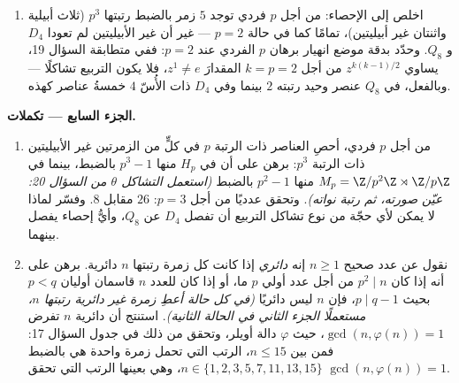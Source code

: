 \begin{problem}
\begin{enumerate}[resume]
        \cref{exo:b3:groups:10}). برهن على أنه يوجد $s \notin N$ يحقق
        $s^p = e$ \emph{(خذ أي $t \notin N$؛ وباستعمال السؤال
        20، صحّحه: $\theta(t) = t^p \in Z(G) \subseteq N$ --- برّر $Z(G) = \langle r^p\rangle$ --- ثم اختر $a$
        بحيث يحقق $s = tr^{a}$ الشرط $s^p = e$؛ وأين استُعملت
        فردية $p$؟)}. وبرهن على أن $srs^{-1} = r^{1+p}$، إلى حدود استبدال $s$
        بقوة له، ثم اخلص إلى أنه توجد زمرة غير أبيلية
        \emph{واحدة} بالضبط رتبتها $p^3$ وأُسّها $p^2$، وهي
        $\Z/p^2\Z \rtimes_\varphi \Z/p\Z$ حيث $\varphi(1)\colon r \mapsto r^{1+p}$ \emph{(استعمل السؤال 3؛ والزمرة
        $\operatorname{Aut}(\Z/p^2\Z)$ دائرية رتبتها $p(p-1)$، وهي نتيجة نقبلها هنا،
        ومنه لها زمرة جزئية وحيدة رتبتها $p$)}.
  \item اخلص إلى الإحصاء: من أجل $p$ فردي توجد $5$ زمر بالضبط
        رتبتها $p^3$ (ثلاث أبيلية واثنتان غير أبيليتين)، تمامًا
        كما في حالة $p = 2$ --- غير أن غير الأبيليتين لم تعودا
        $D_4$ و $Q_8$. وحدّد بدقة موضع انهيار برهان $p$ الفردي
        عند $p = 2$: ففي متطابقة السؤال 19، يساوي $z^{k(k-1)/2}$
        من أجل $k = p = 2$ المقدارَ $z^1 \neq
        e$، فلا يكون التربيع
        تشاكلًا --- وبالفعل، في $Q_8$ عنصر وحيد رتبته $2$ بينما
        وفي $D_4$ ذات الأُسّ $4$ خمسةُ عناصر كهذه.
\end{enumerate}

\medskip
\noindent\textbf{الجزء السابع --- تكملات.}
\begin{enumerate}[resume]
  \item من أجل $p$ فردي، أحصِ العناصر ذات الرتبة $p$ في كلٍّ من
        الزمرتين غير الأبيليتين ذات الرتبة $p^3$: برهن على أن
        في $H_p$ منها $p^3 - 1$ بالضبط، بينما في $M_p =
        \Z/p^2\Z \rtimes \Z/p\Z$ منها
        $p^2 - 1$ بالضبط \emph{(استعمل التشاكل $\theta$ من
        السؤال 20: عيّن صورته، ثم رتبة نواته)}. وتحقق عدديًا من
        أجل $p = 3$: $26$ مقابل $8$. وفسّر لماذا لا يمكن لأي
        حجّة من نوع تشاكل التربيع أن تفصل $D_4$ عن $Q_8$، وأيُّ
        إحصاء يفصل بينهما.
  \item نقول عن عدد صحيح $n \geq 1$ إنه \emph{دائري} إذا كانت كل
        زمرة رتبتها $n$ دائرية. برهن على أنه إذا كان $p^2 \mid n$
        من أجل عدد أولي $p$ ما، أو إذا كان للعدد $n$ قاسمان أوليان
        $p < q$ بحيث $p \mid q - 1$، فإن $n$ ليس دائريًا \emph{(في
        كل حالة أعطِ زمرة غير دائرية رتبتها $n$، مستعملًا الجزء
        الثاني في الحالة الثانية)}. استنتج أن دائرية $n$ تفرض
        $\gcd(n, \varphi(n)) = 1$، حيث $\varphi$ دالة أويلر، وتحقق من ذلك في جدول
        السؤال 17: فمن بين $n \leq 15$، الرتب التي تحمل زمرة
        واحدة هي بالضبط $n \in \{1, 2, 3, 5, 7, 11, 13, 15\}$، وهي بعينها الرتب التي تحقق
        $\gcd(n, \varphi(n)) = 1$.
\end{enumerate}
\end{problem}
